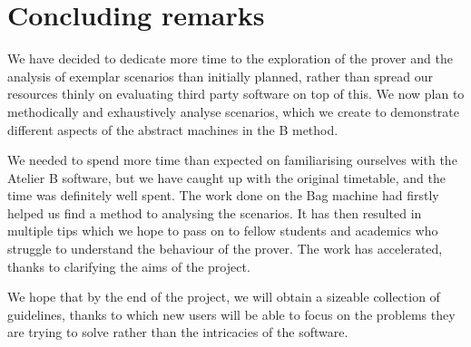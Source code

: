 \documentclass[11pt,journal]{IEEEtran}
\begin{document}
	
	\section{Concluding remarks}
	We have decided to dedicate more time to the exploration of the prover and the analysis of exemplar scenarios than initially planned, rather than spread our resources thinly on evaluating third party software on top of this.	We now plan to methodically and exhaustively analyse scenarios, which we create to demonstrate different aspects of the abstract machines in the B method.  
	
	We needed to spend more time than expected on familiarising ourselves with the Atelier B software, but we have caught up with the original timetable, and the time was definitely well spent. The work done on the Bag machine had firstly helped us find a method to analysing the scenarios. It has then resulted in multiple tips which we hope to pass on to fellow students and academics who struggle to understand the behaviour of the prover. The work has accelerated, thanks to clarifying the aims of the project.
	
	We hope that by the end of the project, we will obtain a sizeable collection of guidelines, thanks to which new users will be able to focus on the problems they are trying to solve rather than the intricacies of the software.
	


	
	\IEEEPARstart{}{} 
	
\end{document}
